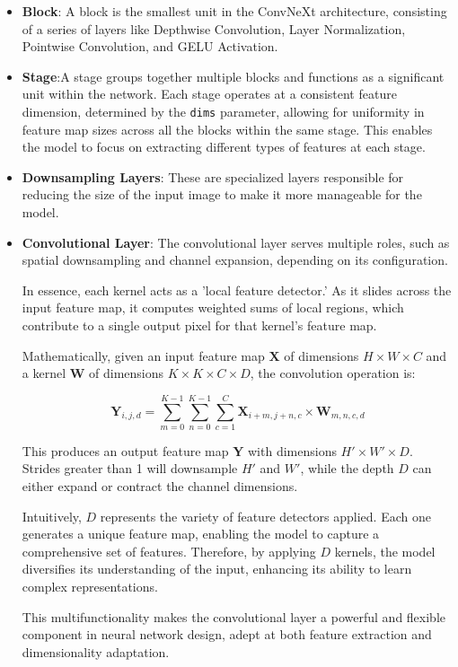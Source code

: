 \documentclass[a4paper,12pt,openright]{book}
\begin{document}
\begin{itemize}
    \item \textbf{Block}: A block is the smallest unit in the ConvNeXt architecture, consisting of a series of layers like Depthwise Convolution, Layer Normalization, Pointwise Convolution, and GELU Activation.
    \item \textbf{Stage}:A stage groups together multiple blocks and functions as a significant unit within the network. Each stage operates at a consistent feature dimension, determined by the \texttt{dims} parameter, allowing for uniformity in feature map sizes across all the blocks within the same stage. This enables the model to focus on extracting different types of features at each stage.
    \item \textbf{Downsampling Layers}: These are specialized layers responsible for reducing the size of the input image to make it more manageable for the model.
   \item \textbf{Convolutional Layer}:
The convolutional layer serves multiple roles, such as spatial downsampling and channel expansion, depending on its configuration. 

In essence, each kernel acts as a 'local feature detector.' As it slides across the input feature map, it computes weighted sums of local regions, which contribute to a single output pixel for that kernel's feature map.

Mathematically, given an input feature map \( \mathbf{X} \) of dimensions \( H \times W \times C \) and a kernel \( \mathbf{W} \) of dimensions \( K \times K \times C \times D \), the convolution operation is:

\[
\mathbf{Y}_{i,j,d} = \sum_{m=0}^{K-1} \sum_{n=0}^{K-1} \sum_{c=1}^{C} \mathbf{X}_{i+m,j+n,c} \times \mathbf{W}_{m,n,c,d}
\]

This produces an output feature map \( \mathbf{Y} \) with dimensions \( H' \times W' \times D \). Strides greater than 1 will downsample \( H' \) and \( W' \), while the depth \( D \) can either expand or contract the channel dimensions.

Intuitively, \( D \) represents the variety of feature detectors applied. Each one generates a unique feature map, enabling the model to capture a comprehensive set of features. Therefore, by applying \( D \) kernels, the model diversifies its understanding of the input, enhancing its ability to learn complex representations.

This multifunctionality makes the convolutional layer a powerful and flexible component in neural network design, adept at both feature extraction and dimensionality adaptation.

\end{itemize}
\end{document}
